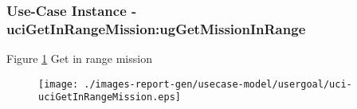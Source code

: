 
	\subsubsection{Use-Case Instance - uciGetInRangeMission:ugGetMissionInRange}
	

	
	Figure \ref{fig:lu.uni.lassy.excalibur.g01.specification-RE-UC-uci-uciGetInRangeMission}
	Get in range mission
	
	\begin{figure}[htbp]
	\begin{center}
	
	\texttt{[image: ./images-report-gen/usecase-model/usergoal/uci-uciGetInRangeMission.eps]}
	\end{center}
	\caption[lu.uni.lassy.excalibur.g01.specification Sequence Diagram: uci-uciGetInRangeMission]{}
	\label{fig:lu.uni.lassy.excalibur.g01.specification-RE-UC-uci-uciGetInRangeMission}
	\end{figure}
	\vspace{0.5cm}
